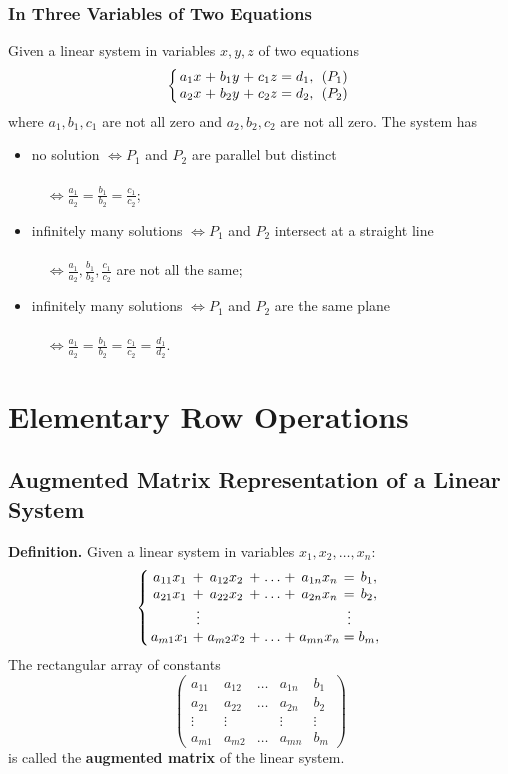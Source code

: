 \documentclass[../ma2001_notes.tex]{subfiles}
\begin{document}
\subsubsection{In Three Variables of Two Equations}
Given a linear system in variables \(x, y, z\) of two equations
\[\left\{
\arraycolsep=1.4pt
\begin{array}{cccccccc}
	a_1x & + & b_1y & + & c_1z & = & d_1, & \ (P_1) \\
	a_2x & + & b_2y & + & c_2z & = & d_2, & \ (P_2)
\end{array}\right.\]
where \(a_1, b_1, c_1\) are not all zero and \(a_2, b_2, c_2\) are not all zero. The system has
\begin{itemize}
	\item no solution \(\iff P_1\) and \(P_2\) are parallel but distinct\\\\
	\(\quad\displaystyle\iff\frac{a_1}{a_2}=\frac{b_1}{b_2}=\frac{c_1}{c_2}\);
	\item infinitely many solutions \(\iff P_1\) and \(P_2\) intersect at a straight line\\\\
	\(\quad\displaystyle\iff\frac{a_1}{a_2},\frac{b_1}{b_2},\frac{c_1}{c_2}\) are not all the same;
	\item infinitely many solutions \(\iff P_1\) and \(P_2\) are the same plane\\\\
	\(\quad\displaystyle\iff\frac{a_1}{a_2}=\frac{b_1}{b_2}=\frac{c_1}{c_2}=\frac{d_1}{d_2}\).
\end{itemize}

\section{Elementary Row Operations}
\subsection{Augmented Matrix Representation of a Linear System}
\textbf{Definition.} Given a linear system in variables \(x_1, x_2, \ldots, x_n\):
\[\left\{
\arraycolsep=1.4pt
\begin{array}{ccccccccc}
	a_{11}x_1 & + & a_{12}x_2 & + & \ldots & + & a_{1n}x_n & = & b_1, \\
	a_{21}x_1 & + & a_{22}x_2 & + & \ldots & + & a_{2n}x_n & = & b_2, \\
	& \vdots & & & & & & \vdots & \\
	a_{m1}x_1 & + & a_{m2}x_2 & + & \ldots & + & a_{mn}x_n & = & b_m,
\end{array}\right.\]
The rectangular array of constants
\[\left(\begin{array}{cccc|c}
	a_{11} & a_{12} & \ldots & a_{1n} & b_1 \\
	a_{21} & a_{22} & \ldots & a_{2n} & b_2 \\
	\vdots & \vdots & & \vdots & \vdots \\
	a_{m1} & a_{m2} & \ldots & a_{mn} & b_m
\end{array}\right)\]
is called the \textbf{augmented matrix} of the linear system.
\end{document}
